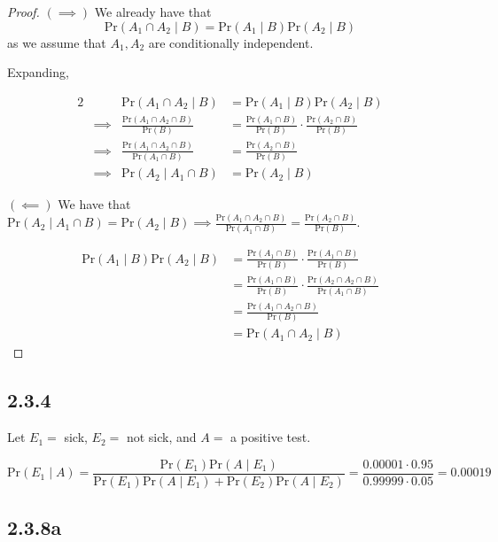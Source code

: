 \documentclass[12pt,letterpaper]{article}
\theoremstyle{definition}
\newcommand{\pr}[1]{\text{Pr}\left(#1\right)}
\begin{document}
\begin{proof}
  $(\implies)$ We already have that
  \[
    \pr{A_1 \cap A_2 \mid B} = \pr{A_1 \mid B}\pr{A_2 \mid B}
  \]
  as we assume that $A_1, A_2$ are conditionally independent.
  
  Expanding,

  \begin{alignat*}{2}
    &&\pr{A_1 \cap A_2 \mid B} &= \pr{A_1 \mid B}\pr{A_2 \mid B} \\
    &\implies& \frac{\pr{A_1 \cap A_2 \cap B}}{\pr{B}} &= \frac{\pr{A_1 \cap
        B}}{\pr{B}} \cdot \frac{\pr{A_2 \cap B}}{\pr{B}}  \\
    &\implies& \frac{\pr{A_1 \cap A_2 \cap B}}{\pr{A_1 \cap B}} &=
      \frac{\pr{A_2 \cap B}}{\pr{B}} \\
      &\implies& \pr{A_2 \mid A_1 \cap B} &= \pr{A_2 \mid B}
  \end{alignat*}

  $(\impliedby)$ We have that $\pr{A_2 \mid A_1 \cap B} = \pr{A_2 \mid B}
  \implies \frac{\pr{A_1 \cap A_2 \cap B}}{\pr{A_1 \cap B}} = \frac{\pr{A_2 \cap B}}{\pr{B}}$.

  \begin{align*}
    \pr{A_1 \mid B}\pr{A_2 \mid B} &= \frac{\pr{A_1 \cap B}}{\pr{B}} \cdot \frac{\pr{A_1 \cap B}}{\pr{B}}\\
                                   &= \frac{\pr{A_1 \cap B}}{\pr{B}} \cdot \frac{\pr{A_2 \cap A_2 \cap B}}{\pr{A_1 \cap B}} \\
                                   &= \frac{\pr{A_1 \cap A_2 \cap B}}{\pr{B}} \\
                                   &= \pr{A_1 \cap A_2 \mid B}
  \end{align*}
\end{proof}

\subsection*{2.3.4}

Let $E_1 = $ sick, $E_2 = $ not sick, and $A = $ a positive test.

\[
  \pr{E_1 \mid A} = \frac{\pr{E_1}\pr{A \mid E_1}}{\pr{E_1}\pr{A \mid E_1} +
    \pr{E_2}\pr{A \mid E_2}} = \frac{0.00001 \cdot 0.95}{0.99999 \cdot 0.05} = 0.00019
\]

\subsection*{2.3.8a}
\end{document}
